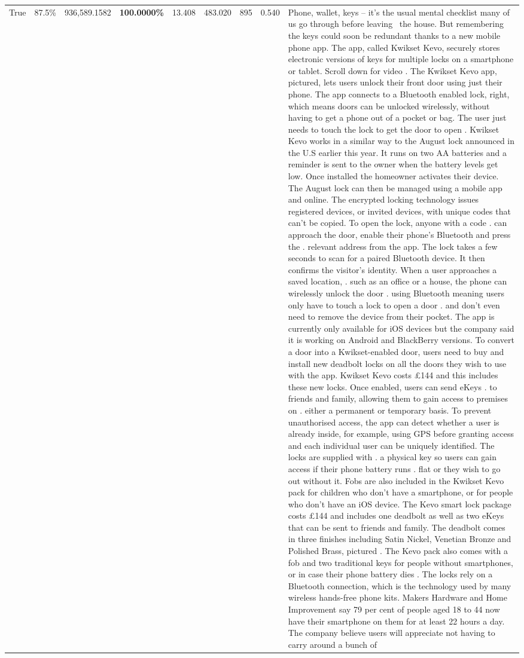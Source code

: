 \begin{table}[H]
\begin{tabular}{lllrlllll}
True & 87.5\% & 936,589.1582 & \bfseries \color{red} 100.0000\% & 13.408 & 483.020 & 895 & 0.540 & Phone, wallet, keys – it’s the usual mental checklist many of us go through before leaving  the house. But remembering the keys could soon be redundant thanks to a new mobile phone app. The app, called Kwikset Kevo, securely stores electronic versions of keys for multiple locks on a smartphone or tablet. Scroll down for video . The Kwikset Kevo app, pictured, lets users unlock their front door using just their phone. The app connects to a Bluetooth enabled lock, right, which means doors can be unlocked wirelessly, without having to get a phone out of a pocket or bag. The user just needs to touch the lock to get the door to open . Kwikset Kevo works in a similar way to the August lock announced in the U.S earlier this year. It runs on two AA batteries and a reminder is sent to the owner when the battery levels get low. Once installed the homeowner activates their device. The August lock can then be managed using a mobile app and online. The encrypted locking technology issues registered devices, or invited devices, with unique codes that can't be copied. To open the lock, anyone with a code . can approach the door, enable their phone's Bluetooth and press the . relevant address from the app. The lock takes a few seconds to scan for a paired Bluetooth device. It then confirms the visitor's identity. When a user approaches a saved location, . such as an office or a house, the phone can wirelessly unlock the door . using Bluetooth meaning users only have to touch a lock to open a door . and don't even need to remove the device from their pocket. The app is currently only available for iOS devices but the company said it is working on Android and BlackBerry versions. To convert a door into a Kwikset-enabled door, users need to buy and install new deadbolt locks on all the doors they wish to use with the app. Kwikset Kevo costs £144 and this includes these new locks. Once enabled, users can send eKeys . to friends and family, allowing them to gain access to premises on . either a permanent or temporary basis. To prevent unauthorised access, the app can detect whether a user is already inside, for example, using GPS before granting access and each individual user can be uniquely identified. The locks are supplied with . a physical key so users can gain access if their phone battery runs . flat or they wish to go out without it. Fobs are also included in the Kwikset Kevo pack for children who don't have a smartphone, or for people who don't have an iOS device. The Kevo smart lock package costs £144 and includes one deadbolt as well as two eKeys that can be sent to friends and family. The deadbolt comes in three finishes including Satin Nickel, Venetian Bronze and Polished Brass, pictured . The Kevo pack also comes with a fob and two traditional keys for people without smartphones, or in case their phone battery dies . The locks rely on a Bluetooth connection, which is the technology used by many wireless hands-free phone kits. Makers Hardware and Home Improvement say 79 per cent of people aged 18 to 44 now have their smartphone on them for at least 22 hours a day. The company believe users will appreciate not having to carry around a bunch of 
\end{tabular}
\end{table}
